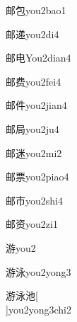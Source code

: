 \begin{verbete}[7;5]{邮包}{you2bao1}
\end{verbete}

\begin{verbete}[7;10]{邮递}{you2di4}
\end{verbete}

\begin{verbete}[7;5]{邮电}{You2dian4}
\end{verbete}

\begin{verbete}[7;9]{邮费}{you2fei4}
\end{verbete}

\begin{verbete}[7;6]{邮件}{you2jian4}
\end{verbete}

\begin{verbete}[7;7]{邮局}{you2ju4}
\end{verbete}

\begin{verbete}[7;9]{邮迷}{you2mi2}
\end{verbete}

\begin{verbete}[7;11]{邮票}{you2piao4}
\end{verbete}

\begin{verbete}[7;5]{邮市}{you2shi4}
\end{verbete}

\begin{verbete}[7;10]{邮资}{you2zi1}
\end{verbete}

\begin{verbete}[12]{游}{you2}
\end{verbete}

\begin{verbete}[12;8]{游泳}{you2yong3}
\end{verbete}

\begin{verbete}[12;8;6]{游泳池}[\\]{you2yong3chi2}
\end{verbete}

